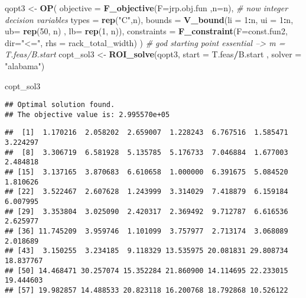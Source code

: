 \documentclass[
]{article}
\newenvironment{Shaded}{\begin{snugshade}}{\end{snugshade}}
\newcommand{\CommentTok}[1]{\textcolor[rgb]{0.56,0.35,0.01}{\textit{#1}}}
\newcommand{\DataTypeTok}[1]{\textcolor[rgb]{0.13,0.29,0.53}{#1}}
\newcommand{\DecValTok}[1]{\textcolor[rgb]{0.00,0.00,0.81}{#1}}
\newcommand{\KeywordTok}[1]{\textcolor[rgb]{0.13,0.29,0.53}{\textbf{#1}}}
\newcommand{\NormalTok}[1]{#1}
\newcommand{\OperatorTok}[1]{\textcolor[rgb]{0.81,0.36,0.00}{\textbf{#1}}}
\newcommand{\StringTok}[1]{\textcolor[rgb]{0.31,0.60,0.02}{#1}}
\begin{document}
\begin{Shaded}
\begin{Highlighting}[]
\NormalTok{qopt3 <-}\StringTok{ }\KeywordTok{OP}\NormalTok{(}
  \DataTypeTok{objective =} \KeywordTok{F_objective}\NormalTok{(}\DataTypeTok{F=}\NormalTok{jrp.obj.fun ,}\DataTypeTok{n=}\NormalTok{n),}
  \CommentTok{# now integer decision variables}
  \DataTypeTok{types =} \KeywordTok{rep}\NormalTok{(}\StringTok{"C"}\NormalTok{,n),}
  \DataTypeTok{bounds =} \KeywordTok{V_bound}\NormalTok{(}\DataTypeTok{li =} \DecValTok{1}\OperatorTok{:}\NormalTok{n, }\DataTypeTok{ui =} \DecValTok{1}\OperatorTok{:}\NormalTok{n, }\DataTypeTok{ub=} \KeywordTok{rep}\NormalTok{(}\DecValTok{50}\NormalTok{, n) , }\DataTypeTok{lb=} \KeywordTok{rep}\NormalTok{(}\DecValTok{1}\NormalTok{, n)),}
  \DataTypeTok{constraints =} \KeywordTok{F_constraint}\NormalTok{(}\DataTypeTok{F=}\NormalTok{const.fun2,}
                             \DataTypeTok{dir=}\StringTok{"<="}\NormalTok{,}
                             \DataTypeTok{rhs =}\NormalTok{ rack_total_width)}
\NormalTok{)}
\CommentTok{# god starting point essential --> m = T.feas/B.start}
\NormalTok{copt_sol3 <-}\StringTok{ }\KeywordTok{ROI_solve}\NormalTok{(qopt3, }\DataTypeTok{start =}\NormalTok{ T.feas}\OperatorTok{/}\NormalTok{B.start , }\DataTypeTok{solver =} \StringTok{"alabama"}\NormalTok{)}

\NormalTok{copt_sol3}
\end{Highlighting}
\end{Shaded}

\begin{verbatim}
## Optimal solution found.
## The objective value is: 2.995570e+05
\end{verbatim}

\begin{Shaded}
\end{Shaded}

\begin{verbatim}
##  [1]  1.170216  2.058202  2.659007  1.228243  6.767516  1.585471  3.224297
##  [8]  3.306719  6.581928  5.135785  5.176733  7.046884  1.677003  2.484818
## [15]  3.137165  3.870683  6.610658  1.000000  6.391675  5.084520  1.810626
## [22]  3.522467  2.607628  1.243999  3.314029  7.418879  6.159184  6.007995
## [29]  3.353804  3.025090  2.420317  2.369492  9.712787  6.616536  2.625977
## [36] 11.745209  3.959746  1.101099  3.757977  2.713174  3.068089  2.018689
## [43]  3.150255  3.234185  9.118329 13.535975 20.081831 29.808734 18.837767
## [50] 14.468471 30.257074 15.352284 21.860900 14.114695 22.233015 19.444603
## [57] 19.982857 14.488533 20.823118 16.200768 18.792868 10.526122
\end{verbatim}
\end{document}
